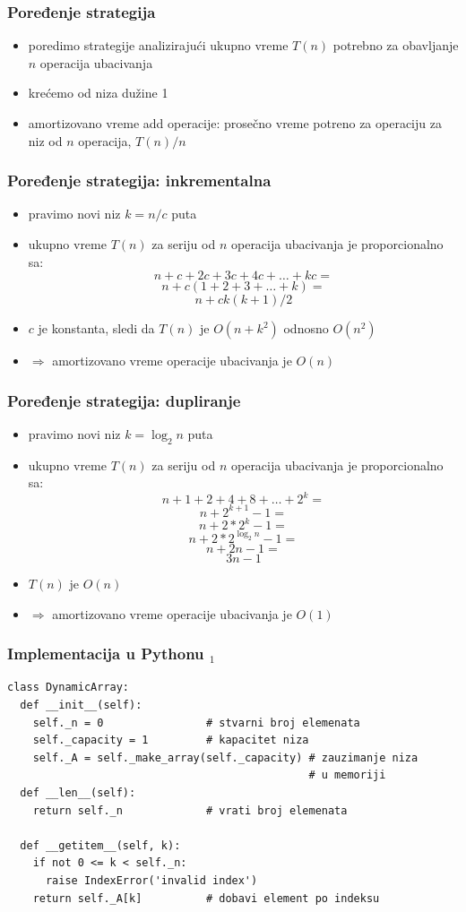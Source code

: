 \documentclass[compress,aspectratio=169]{beamer}
\begin{document}
\begin{frame}[fragile]
  \frametitle{Poređenje strategija}
  \begin{itemize}
    \item poredimo strategije analizirajući ukupno vreme $T(n)$ potrebno za
    obavljanje $n$ operacija ubacivanja
    \item krećemo od niza dužine 1
    \item amortizovano vreme add operacije: prosečno vreme potreno za operaciju
    za niz od $n$ operacija, $T(n)/n$
  \end{itemize}
\end{frame}

\begin{frame}[fragile]
  \frametitle{Poređenje strategija: inkrementalna}
  \begin{itemize}
    \item pravimo novi niz $k = n/c$ puta
    \item ukupno vreme $T(n)$ za seriju od $n$ operacija ubacivanja je
    proporcionalno sa:
    $$ n + c + 2c + 3c + 4c + \ldots + kc = $$
    $$ n + c(1 + 2 + 3 + \ldots + k) = $$
    $$ n + ck(k+1)/2$$
    \item $c$ je konstanta, sledi da $T(n)$ je $O(n+k^2)$ odnosno $O(n^2)$
    \item $\Rightarrow$ amortizovano vreme operacije ubacivanja je $O(n)$
  \end{itemize}
\end{frame}

\begin{frame}[fragile]
  \frametitle{Poređenje strategija: dupliranje}
  \begin{itemize}
    \item pravimo novi niz $k = \log_2 n$ puta
    \item ukupno vreme $T(n)$ za seriju od $n$ operacija ubacivanja je
    proporcionalno sa:
    $$ n + 1 + 2 + 4 + 8 + \ldots + 2^k = $$
    $$ n + 2^{k+1} - 1 = $$
    $$ n + 2 * 2^{k} -1 = $$
    $$ n + 2 * 2^{\log_2 n} -1 = $$
    $$ n + 2n -1 = $$
    $$ 3n - 1$$
    \item $T(n)$ je $O(n)$
    \item $\Rightarrow$ amortizovano vreme operacije ubacivanja je $O(1)$
  \end{itemize}
\end{frame}

\begin{frame}[fragile,shrink=15]
  \frametitle{Implementacija u Pythonu $_1$}
\begin{verbatim}
class DynamicArray:
  def __init__(self):
    self._n = 0                # stvarni broj elemenata
    self._capacity = 1         # kapacitet niza
    self._A = self._make_array(self._capacity) # zauzimanje niza
                                               # u memoriji
  def __len__(self):
    return self._n             # vrati broj elemenata
    
  def __getitem__(self, k):
    if not 0 <= k < self._n:
      raise IndexError('invalid index')
    return self._A[k]          # dobavi element po indeksu
\end{verbatim}
\end{frame}
\end{document}
